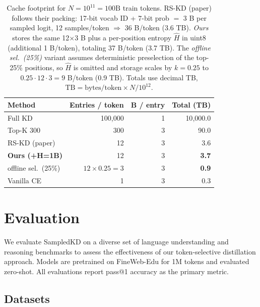\documentclass[11pt]{article}
\begin{document}
\begin{table}[h]
	\centering
	\begin{adjustbox}{max width=\linewidth}
		\begin{tabular}{lrrr}
			\toprule
			Method                    & Entries / token          & B / entry & Total (TB)   \\
			\midrule
			Full KD                   & 100{,}000                & 1         & 10{,}000.0   \\
			Top-K 300                 & 300                      & 3         & 90.0         \\
			RS-KD (paper)             & 12                       & 3         & 3.6          \\
			\textbf{Ours (+H=1B)}     & 12                       & 3         & \textbf{3.7} \\
			\quad offline sel.~(25\%) & $12 \!\times\! 0.25 = 3$ & 3         & \textbf{0.9} \\
			Vanilla CE                & 1                        & 3         & 0.3          \\
			\bottomrule
		\end{tabular}
	\end{adjustbox}
	\caption{Cache footprint for $N{=}10^{11}{=}100\text{B}$ train tokens. RS-KD (paper) follows their packing: 17-bit vocab ID + 7-bit prob $=$ 3 B per sampled logit, 12 samples/token $\Rightarrow$ 36 B/token (3.6 TB). \textit{Ours} stores the same 12$\times$3 B plus a per-position entropy $\hat H$ in uint8 (additional 1 B/token), totaling 37 B/token (3.7 TB). The \textit{offline sel.~(25\%)} variant assumes deterministic preselection of the top-25\% positions, so $\hat H$ is omitted and storage scales by $k{=}0.25$ to $0.25{\cdot}12{\cdot}3{=}9$ B/token (0.9 TB). Totals use decimal TB, $\mathrm{TB}=\text{bytes/token}\times N/10^{12}$.}
	\label{tab:storage}
\end{table}

\section{Evaluation}
\label{sec:evaluation}

We evaluate SampledKD on a diverse set of language understanding and reasoning benchmarks to assess the effectiveness of our token-selective distillation approach. Models are pretrained on FineWeb-Edu for 1M tokens and evaluated zero-shot. All evaluations report pass@1 accuracy as the primary metric.
\subsection{Datasets}
\end{document}

